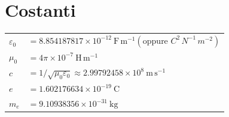 \documentclass{book}
\begin{document}
\section*{Costanti}
\begin{tabular}{ll}
$\varepsilon_0$ & $=8.854187817\times10^{-12}\ \mathrm{F\,m^{-1}}(\text{oppure } C^2\,N^{-1}\,m^{-2})$  \\
$\mu_0$  &  $=4\pi\times10^{-7}\ \mathrm{H\,m^{-1}}$ \\
$c$ & $=1/\sqrt{\mu_0\varepsilon_0}\approx2.99792458\times10^8\ \mathrm{m\,s^{-1}}$ \\
$e$ & $=1.602176634\times10^{-19}\ \mathrm{C}$ \\
$m_e$ & $=9.10938356\times10^{-31}\ \mathrm{kg}$ \\
\end{tabular}
\end{document}
